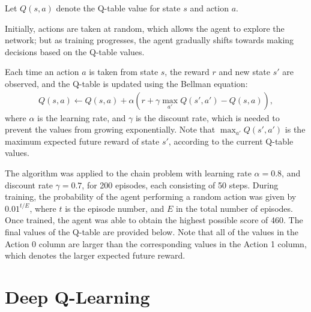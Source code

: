 Let $Q(s,a)$ denote the Q-table value for state $s$ and action $a$.

Initially, actions are taken at random, which allows the agent to explore the
network; but as training progresses, the agent gradually shifts towards making
decisions based on the Q-table values.

Each time an action $a$ is taken from state $s$, the reward $r$ and new state
$s'$ are observed, and the Q-table is updated using the Bellman equation:
\begin{align}
    Q(s,a) \leftarrow Q(s,a) + \alpha (r + \gamma\max_{a'}Q(s',a') - Q(s,a)),
    \label{eq:RL:QL}
\end{align}
where $\alpha$ is the learning rate, and $\gamma$ is the discount rate, which is
needed to prevent the values from growing exponentially.
Note that $\max_{a'}Q(s',a')$ is the maximum expected future reward of state
$s'$, according to the current Q-table values.

The algorithm was applied to the chain problem with learning rate $\alpha =
0.8$, and discount rate $\gamma = 0.7$, for 200 episodes, each consisting of 50
steps.
During training, the probability of the agent performing a random action was
given by $0.01^{t/E}$, where $t$ is the episode number, and $E$ in the total
number of episodes.
Once trained, the agent was able to obtain the highest possible score of 460.
The final values of the Q-table are provided below.
Note that all of the values in the Action 0 column are larger than the
corresponding values in the Action 1 column, which denotes the larger expected
future reward.



\section{Deep Q-Learning}

